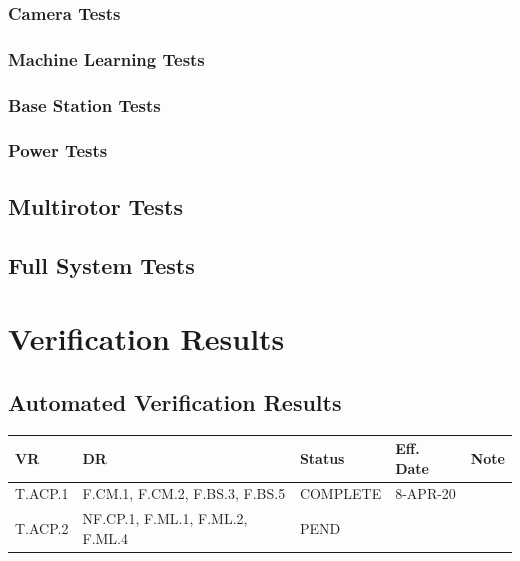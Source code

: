 \documentclass[10pt,letterpaper]{article}
\begin{document}
\subsubsection{Camera Tests}


\subsubsection{Machine Learning Tests}


\subsubsection{Base Station Tests}


\subsubsection{Power Tests}


\subsection{Multirotor Tests}


\subsection{Full System Tests}


\section{Verification Results} \label{results}

\subsection{Automated Verification Results}
\begin{table}[H]
	\centering
	\begin{tabular}{lllll}
	\hline
	\textbf{VR} & \textbf{DR} & \textbf{Status} & \textbf{Eff. Date} & \textbf{Note}\\
	\hline
	T.ACP.1 & F.CM.1, F.CM.2, F.BS.3, F.BS.5 & COMPLETE   &8-APR-20 & \\
	T.ACP.2 & NF.CP.1, F.ML.1, F.ML.2, F.ML.4 & PEND   & \\
	\hline
	\end{tabular}
\end{table}
\end{document}

